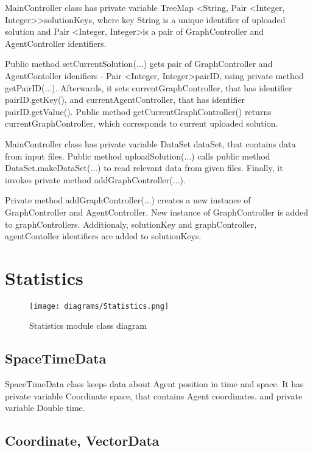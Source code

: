 \documentclass[thesis=B,english]{FITthesis}[2019/12/23]
\begin{document}
MainController class has private variable TreeMap \textless String, Pair \textless Integer, Integer\textgreater\textgreater   solutionKeys, where key String is a unique identifier of uploaded solution and Pair \textless Integer, Integer\textgreater is a pair of GraphController and AgentController identifiers.

Public method setCurrentSolution(...) gets pair of GraphController and AgentContoller idenifiers - Pair \textless Integer, Integer\textgreater pairID, using private method getPairID(...). Afterwards, it sets currentGraphController, that has identifier pairID.getKey(), and currentAgentController, that has identifier pairID.getValue(). Public method getCurrentGraphController() returns currentGraphController, which corresponds to current uploaded solution.

MainController class has private variable DataSet dataSet, that contains data from input files. Public method uploadSolution(...) calls public method DataSet.makeDataSet(...) to read relevant data from given files. Finally, it invokes private method addGraphController(...).

Private method addGraphController(...) creates a new instance of GraphController and AgentController. New instance of GraphController is added to graphControllers. Additionaly, solutionKey and graphController, agentContoller identifiers are added to solutionKeys.

\section{Statistics}

\begin{figure}
	\texttt{[image: diagrams/Statistics.png]}
	\caption[Statistics module class diagams]{Statistics module class diagram}\label{fig:float14}
\end{figure}


\subsection{SpaceTimeData}

SpaceTimeData class keeps data about Agent position in time and space. It has private variable Coordinate space, that contains Agent coordinates, and private variable Double time.

\subsection{Coordinate, VectorData}
\end{document}
